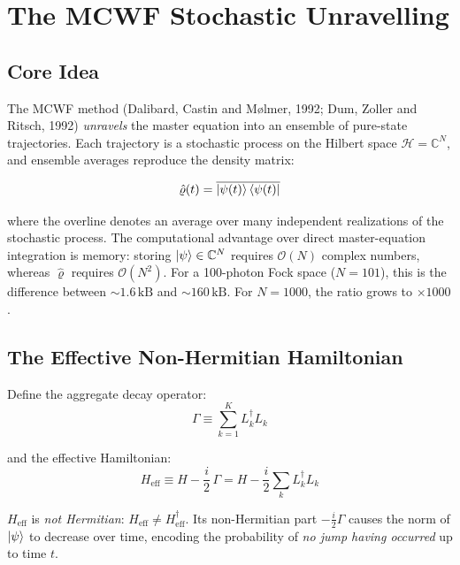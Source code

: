 \documentclass[11pt,a4paper,twoside]{book}
\newcommand{\Heff}{H_{\mathrm{eff}}}
\newcommand{\HeffDef}{H - \frac{i}{2}\sum_k L_k^\dagger L_k}
\newcommand{\densmat}{\hat{\varrho}}    %
\newcommand{\Hilbert}{\mathcal{H}}   %
\newcommand{\Order}{\mathcal{O}}
\newcommand{\complex}{\mathbb{C}}
\theoremstyle{definition}
\theoremstyle{remark}
\begin{document}
\section{The MCWF Stochastic Unravelling}
\label{sec:mcwf-theory}

\subsection{Core Idea}
\label{subsec:mcwf-core}

The MCWF method (Dalibard, Castin and M{\o}lmer, 1992; Dum, Zoller and Ritsch,
1992) \emph{unravels} the master equation into an ensemble of pure-state
trajectories. Each trajectory is a stochastic process on the Hilbert space
$\Hilbert = \complex^N$, and ensemble averages reproduce the density matrix:

\begin{equation}
  \densmat(t) = \overline{\ket{\psi(t)}\bra{\psi(t)}}
  \label{eq:mcwf-avg}
\end{equation}

where the overline denotes an average over many independent realizations
of the stochastic process. The computational advantage over direct
master-equation integration is memory: storing $\ket{\psi} \in \complex^N$
requires $\Order(N)$ complex numbers, whereas $\densmat$ requires
$\Order(N^2)$. For a 100-photon Fock space ($N = 101$), this is the
difference between $\sim 1.6\,\mathrm{kB}$ and $\sim 160\,\mathrm{kB}$.
For $N = 1000$, the ratio grows to $\times 1000$.

\subsection{The Effective Non-Hermitian Hamiltonian}
\label{subsec:heff}

Define the aggregate decay operator:
\begin{equation}
  \Gamma \equiv \sum_{k=1}^{K} L_k^\dagger L_k
  \label{eq:Gamma-def}
\end{equation}

and the effective Hamiltonian:
\begin{equation}
  \Heff \equiv H - \frac{i}{2}\,\Gamma = \HeffDef
  \label{eq:heff}
\end{equation}

$\Heff$ is \emph{not Hermitian}: $\Heff \neq \Heff^\dagger$.
Its non-Hermitian part $-\tfrac{i}{2}\Gamma$ causes the norm of
$\ket{\psi}$ to decrease over time, encoding the probability of
\emph{no jump having occurred} up to time $t$.
\end{document}
